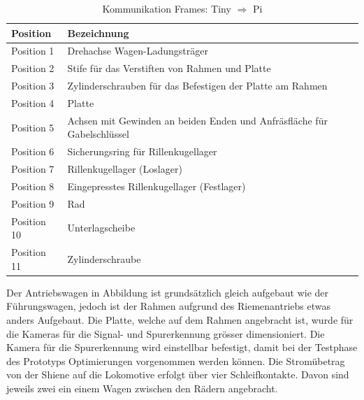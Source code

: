 \documentclass[../../main.tex]{subfiles}
\begin{document}
    \begin{table}[H] \centering
        \begin{tabular}{|l|l|}
        \hline
        \textbf{Position} & \textbf{Bezeichnung}\\
        \hline
        Position 1          & Drehachse Wagen-Ladungsträger\\
         \hline
        Position 2          & Stife für das Verstiften von Rahmen und Platte\\
        \hline
        Position 3          & Zylinderschrauben für das Befestigen der Platte am Rahmen\\
        \hline
        Position 4          & Platte\\
        \hline
        Position 5          & Achsen mit Gewinden an beiden Enden und Anfräsfläche für Gabelschlüssel\\
        \hline
        Position 6          & Sicherungsring für Rillenkugellager\\
        \hline
        Position 7          & Rillenkugellager (Loslager)\\
        \hline
        Position 8          & Eingepresstes Rillenkugellager (Festlager)\\
        \hline
        Position 9          & Rad\\
        \hline
        Position 10         & Unterlagscheibe\\
        \hline
        Position 11         & Zylinderschraube\\
        \hline
        \end{tabular}
        
        \caption{Kommunikation Frames: Tiny $\Rightarrow$ Pi}
        \label{tab:com_tiny_pi}
        \end{table}
    \newpage
    Der Antriebswagen in Abbildung ist grundsätzlich gleich aufgebaut wie der Führungswagen, jedoch ist der Rahmen aufgrund des Riemenantriebs etwas anders Aufgebaut. Die Platte, welche auf dem Rahmen angebracht ist, wurde für die Kameras für die Signal- und Spurerkennung grösser dimensioniert. Die Kamera für die Spurerkennung wird einstellbar befestigt, damit bei der Testphase des Prototyps Optimierungen vorgenommen werden können. Die Stromübetrag von der Shiene auf die Lokomotive erfolgt über vier Schleifkontakte. Davon sind jeweils zwei ein einem Wagen zwischen den Rädern angebracht.
\end{document}
